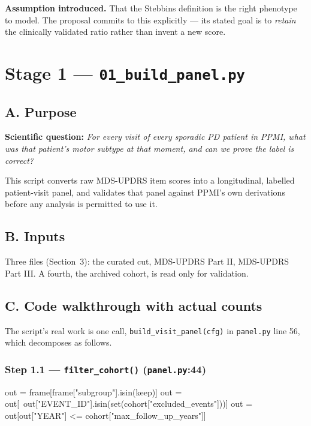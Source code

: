 \documentclass[11pt,a4paper]{article}
\newcommand{\code}[1]{\texttt{\small #1}}
\begin{document}
\textbf{Assumption introduced.} That the Stebbins definition is the right
phenotype to model. The proposal commits to this explicitly --- its stated goal
is to \emph{retain} the clinically validated ratio rather than invent a new
score.

\section{Stage 1 --- \code{01\_build\_panel.py}}

\subsection{A. Purpose}

\textbf{Scientific question:} \emph{For every visit of every sporadic PD
patient in PPMI, what was that patient's motor subtype at that moment, and can
we prove the label is correct?}

This script converts raw MDS-UPDRS item scores into a longitudinal, labelled
patient-visit panel, and validates that panel against PPMI's own derivations
before any analysis is permitted to use it.

\subsection{B. Inputs}

Three files (Section~3): the curated cut, MDS-UPDRS Part II, MDS-UPDRS
Part III. A fourth, the archived cohort, is read only for validation.

\subsection{C. Code walkthrough with actual counts}

The script's real work is one call, \code{build\_visit\_panel(cfg)} in
\code{panel.py} line 56, which decomposes as follows.

\subsubsection*{Step 1.1 --- \code{filter\_cohort()} \quad (\code{panel.py}:44)}

\begin{codeblock}
out = frame[frame["subgroup"].isin(keep)]
out = out[~out["EVENT_ID"].isin(set(cohort["excluded_events"]))]
out = out[out["YEAR"] <= cohort["max_follow_up_years"]]
\end{codeblock}
\end{document}

